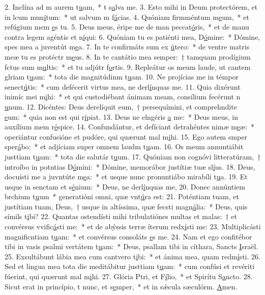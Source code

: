 2. Inclína ad m aurem t\uline{u}am,~* t s\uline{a}lva me.
3. Esto mihi in Deum protectórem, et in lcum mun\uline{í}tum:~* ut salvum m f\uline{á}cias.
4. Quóniam firmméntum m\uline{e}um,~* et refúgium mem \uline{e}s tu.
5. Deus meus, éripe me de man peccat\uline{ó}ris,~* et de manu contra legem agéntis et n\uline{í}qui:
6. Quóniam tu es patiénti mea, D\uline{ó}mine:~* Dómine, spes mea a juventút m\uline{e}a.
7. In te confirmáts sum ex \uline{ú}tero:~* de ventre matris meæ tu es protéctr m\uline{e}us.
8. In te cantátio mea semper:~† tamquam prodígium fctus sum m\uline{u}ltis:~* et tu adjútr f\uline{o}rtis.
9. Repleátur os meum laude, ut cantem glriam t\uline{u}am:~* tota die magnitúdinm t\uline{u}am.
10. Ne projícias me in témpor senect\uline{ú}tis:~* cum defécerit virtus mea, ne derl\uline{í}nquas me.
11. Quia dixérunt inimíc mei m\uline{i}hi:~* et qui custodiébant ánimam meam, consílium fecérunt n \uline{u}num.
12. Dicéntes: Deus derelíquit eum,~† persequímini, et comprehndite \uline{e}um:~* quia non est qui r\uline{í}piat.
13. Deus ne elngéris \uline{a} me:~* Deus meus, in auxílium mem r\uline{é}spice.
14. Confundántur, et defíciant detrahéntes nimæ m\uline{e}æ:~* operiántur confusióne et pudóre, qui quærunt mal m\uline{i}hi.
15. Ego autem smper sper\uline{á}bo:~* et adjíciam super omnem laudm t\uline{u}am.
16. Os meum annuntiábit justtiam t\uline{u}am:~* tota die salutár t\uline{u}um.
17. Quóniam non cognóvi litteratúram,~† introíbo in potntias D\uline{ó}mini:~* Dómine, memorábor justítiæ tuæ sl\uline{í}us.
18. Deus, docuísti me a juvntúte m\uline{e}a:~* et usque nunc pronuntiábo mirabíli t\uline{u}a.
19. Et usque in senctam et s\uline{é}nium:~* Deus, ne derl\uline{í}nquas me,
20. Donec annúntiem brchium t\uline{u}um~* generatióni omni, quæ vnt\uline{ú}ra est:
21. Poténtiam tuam, et justítiam tuam, Deus,~† usque in altíssima, quæ fecsti magn\uline{á}lia:~* Deus, quis símils t\uline{i}bi?
22. Quantas ostendísti mihi tribulatiónes multas et malas:~† et convérsus vvific\uline{á}sti me:~* et de abýssis terræ íterum redx\uline{í}sti me:
23. Multiplicásti magnificntiam t\uline{u}am:~* et convérsus consoláts \uline{e}s me.
24. Nam et ego confitébor tibi in vasis psalmi vertátem t\uline{u}am:~* Deus, psallam tibi in cíthara, Sancts \uline{I}sraël.
25. Exsultábunt lábia mea cum cantvero t\uline{i}bi:~* et ánima mea, quam redm\uline{í}sti.
26. Sed et lingua mea tota die meditábitur justtiam t\uline{u}am:~* cum confúsi et revériti fúerint, qui quærunt mal m\uline{i}hi.
27. Glória Ptri, et F\uline{í}lio,~* et Spirítu S\uline{a}ncto.
28. Sicut erat in princípio, t nunc, et s\uline{e}mper,~* et in sǽcula sæculórm. \uline{A}men.
